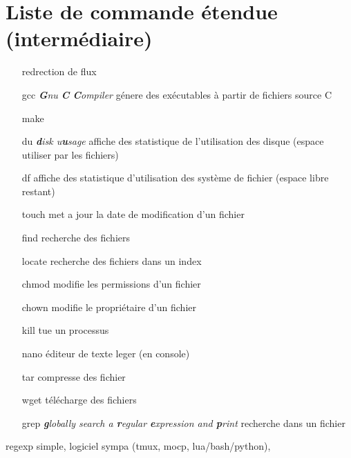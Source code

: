\documentclass[french, a4paper, 12pt, titlepage]{article}
\begin{document}








\section{Liste de commande étendue (intermédiaire)}
\begin{enumerate}
\item[redrection de flux] 
\item[gcc] \emph{\textbf{G}nu \textbf{C} \textbf{C}ompiler}  génere des exécutables à partir de fichiers source C
\item[make] 
\item[du] \emph{\textbf{d}isk u\textbf{u}sage} affiche des statistique de l'utilisation des disque (espace utiliser par les fichiers)
\item[df] affiche des statistique d'utilisation des système de fichier (espace libre restant)
\item[touch] met a jour la date de modification d'un fichier
\item[find] recherche des fichiers
\item[locate] recherche des fichiers dans un index
\item[chmod] modifie les permissions d'un fichier
\item[chown] modifie le propriétaire d'un fichier
\item[kill] tue un processus
\item[nano] éditeur de texte leger (en console)
\item[tar] compresse des fichier
\item[wget] télécharge des fichiers
\item[grep] \emph{\textbf{g}lobally search a \textbf{r}egular \textbf{e}xpression and \textbf{p}rint} recherche dans un fichier
\end{enumerate}
regexp simple, logiciel sympa (tmux, mocp, lua/bash/python),
\end{document}
